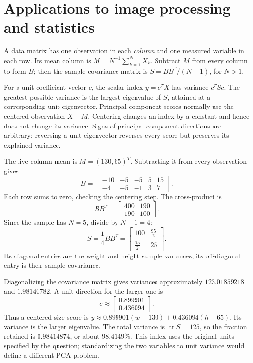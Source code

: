 \section{Applications to image processing and statistics}
A data matrix has one observation in each \emph{column} and one measured variable in each row. Its mean column is $M=N^{-1}\sum_{k=1}^N X_k$. Subtract $M$ from every column to form $B$; then the sample covariance matrix is $S=BB^T/(N-1)$, for $N>1$.

For a unit coefficient vector $c$, the scalar index $y=c^TX$ has variance $c^TSc$. The greatest possible variance is the largest eigenvalue of $S$, attained at a corresponding unit eigenvector. Principal component scores normally use the centered observation $X-M$. Centering changes an index by a constant and hence does not change its variance. Signs of principal component directions are arbitrary: reversing a unit eigenvector reverses every score but preserves its explained variance.

The five-column mean is $M=(130,65)^T$. Subtracting it from every observation gives
\[B=\begin{bmatrix}-10&-5&-5&5&15\\-4&-5&-1&3&7\end{bmatrix}.\]
Each row sums to zero, checking the centering step. The cross-product is
\[BB^T=\begin{bmatrix}400&190\\190&100\end{bmatrix}.\]
Since the sample has $N=5$, divide by $N-1=4$:
\[S=\frac14BB^T=\begin{bmatrix}100&\frac{95}{2}\\\frac{95}{2}&25\end{bmatrix}.\]
Its diagonal entries are the weight and height sample variances; its off-diagonal entry is their sample covariance.

Diagonalizing the covariance matrix gives variances approximately $123.01859218$ and $1.98140782$. A unit direction for the larger one is
\[c\approx\begin{bmatrix}0.899901\\0.436094\end{bmatrix}.\]
Thus a centered size score is $y\approx0.899901(w-130)+0.436094(h-65)$. Its variance is the larger eigenvalue. The total variance is $\operatorname{tr}S=125$, so the fraction retained is $0.98414874$, or about $98.4149\%$. This index uses the original units specified by the question; standardizing the two variables to unit variance would define a different PCA problem.

